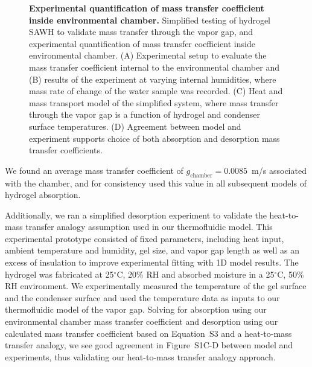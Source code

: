 \documentclass[11pt]{article}
\begin{document}
\begin{figure}[t]
\centering
{}
\caption{\textbf{Experimental quantification of mass transfer coefficient inside environmental chamber.} Simplified testing of hydrogel SAWH to validate mass transfer through the vapor gap, and experimental quantification of mass transfer coefficient inside environmental chamber. (A) Experimental setup to evaluate the mass transfer coefficient internal to the environmental chamber and (B) results of the experiment at varying internal humidities, where mass rate of change of the water sample was recorded. (C) Heat and mass transport model of the simplified system, where mass transfer through the vapor gap is a function of hydrogel and condenser surface temperatures. (D) Agreement between model and experiment supports choice of both absorption and desorption mass transfer coefficients.}
\label{fig:S1}
\end{figure}

We found an average mass transfer coefficient of $g_{\mathrm{chamber}} = 0.0085$~m/s associated with the chamber, and for consistency used this value in all subsequent models of hydrogel absorption.

Additionally, we ran a simplified desorption experiment to validate the heat-to-mass transfer analogy assumption used in our thermofluidic model. This experimental prototype consisted of fixed parameters, including heat input, ambient temperature and humidity, gel size, and vapor gap length as well as an excess of insulation to improve experimental fitting with 1D model results. The hydrogel was fabricated at 25$^\circ$C, 20\% RH and absorbed moisture in a 25$^\circ$C, 50\% RH environment. We experimentally measured the temperature of the gel surface and the condenser surface and used the temperature data as inputs to our thermofluidic model of the vapor gap. Solving for absorption using our environmental chamber mass transfer coefficient and desorption using our calculated mass transfer coefficient based on Equation~S3 and a heat-to-mass transfer analogy, we see good agreement in Figure~S1C-D between model and experiments, thus validating our heat-to-mass transfer analogy approach.
\end{document}
